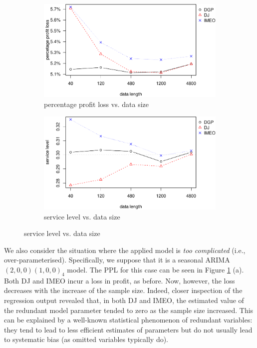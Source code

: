 \documentclass{article}
\begin{document}
\begin{figure}[ht]
\centering
\caption{Performance vs. sample size with over-paramaterised linear model}
\begin{subfigure}[b]{0.48\textwidth}
\centering
\includegraphics[width=\textwidth]{information-plot_files/figure-latex/SAR(3)(1)_4ppl-1.pdf}
\caption{percentage profit loss vs. data size}
\end{subfigure}
\hfill
\begin{subfigure}[b]{0.48\textwidth}
\centering
\includegraphics[width=\textwidth]{information-plot_files/figure-latex/SAR(3)(1)_4sl-1.pdf}
\caption{service level vs. data size}
\end{subfigure}
\label{fig:mis_over}
\end{figure}

We also consider the situation where the applied model is \emph{too complicated} (i.e., over-parameterised). Specifically, we suppose that it is a seasonal ARIMA$(2,0,0)(1,0,0)_4$ model. The PPL for this case can be seen in Figure \ref{fig:mis_over} (a). Both DJ and IMEO incur a loss in profit, as before. Now, however, the loss decreases with the increase of the sample size. Indeed, closer inspection of the regression output revealed that, in both DJ and IMEO, the estimated value of the redundant model parameter tended to zero as the sample size increased. This can be explained by a well-known statistical phenomenon of redundant variables: they tend to lead to less efficient estimates of parameters but do not usually lead to systematic bias (as omitted variables typically do).
\end{document}
